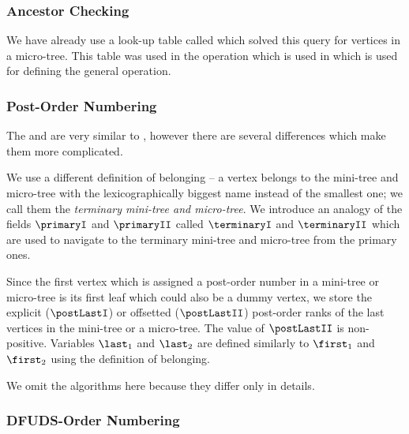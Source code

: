 \subsubsection{Ancestor Checking}

We have already use a look-up table called \isAncestor{} which solved this query for vertices in a micro-tree.
This table was used in the operation \subtreeSize{} which is used in \preRank{} which is used for defining the general \isAncestor{} operation.

\begin{algorithm}
\begin{algorithmic}
	\State {}
\EndFunction
\end{algorithmic}
\end{algorithm}

\subsubsection{Post-Order Numbering}

The \postRank{} and \postSelect{} are very similar to \preAny{}, however there are several differences which make them more complicated.

We use a different definition of belonging -- a vertex belongs to the mini-tree and micro-tree with the lexicographically biggest name instead of the smallest one; we call them the \emph{terminary mini-tree and micro-tree}.
We introduce an analogy of the fields $\primaryI$ and $\primaryII$ called $\terminaryI$ and $\terminaryII$ which are used to navigate to the terminary mini-tree and micro-tree from the primary ones.

Since the first vertex which is assigned a post-order number in a mini-tree or micro-tree is its first leaf which could also be a dummy vertex, we store the explicit ($\postLastI$) or offsetted ($\postLastII$) post-order ranks of the last vertices in the mini-tree or a micro-tree.
The value of $\postLastII$ is non-positive.
Variables $\last_1$ and $\last_2$ are defined similarly to $\first_1$ and $\first_2$ using the definition of belonging.

We omit the algorithms here because they differ only in details.

\subsubsection{DFUDS-Order Numbering}

